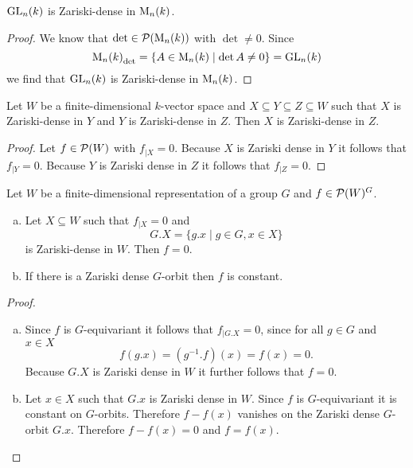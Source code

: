 \begin{cor}
 $\operatorname{GL}_n(k)$ is Zariski-dense in $\operatorname{M}_n(k)$.
\end{cor}
\begin{proof}
 We know that $\det \in \mathcal{P}(\operatorname{M}_n(k))$ with $\det \neq 0$. Since
 \[
  {\operatorname{M}_n(k)}_{\det} = \{A \in \operatorname{M}_n(k) \mid \det A \neq 0\} = \operatorname{GL}_n(k)
 \]
 we find that $\operatorname{GL}_n(k)$ is Zariski-dense in $\operatorname{M}_n(k)$.
\end{proof}


\begin{prop}
 Let $W$ be a finite-dimensional $k$-vector space and $X \subseteq Y \subseteq Z \subseteq W$ such that $X$ is Zariski-dense in $Y$ and $Y$ is Zariski-dense in $Z$. Then $X$ is Zariski-dense in $Z$.
\end{prop}
\begin{proof}
 Let $f \in \mathcal{P}(W)$ with $f_{|X} = 0$. Because $X$ is Zariski dense in $Y$ it follows that $f_{|Y} = 0$. Because $Y$ is Zariski dense in $Z$ it follows that $f_{|Z} = 0$.
\end{proof}


\begin{lem}\label{lem: zariski density orbits}
 Let $W$ be a finite-dimensional representation of a group $G$ and $f \in \mathcal{P}(W)^G$.
 \begin{enumerate}[a)]
  \item
  Let $X \subseteq W$ such that $f_{|X} = 0$ and
  \[
   G.X = \{g.x \mid g \in G, x \in X\}
  \]
  is Zariski-dense in $W$. Then $f = 0$.
  \item
  If there is a Zariski dense $G$-orbit then $f$ is constant.
 \end{enumerate}
\end{lem}
\begin{proof}\leavevmode
 \begin{enumerate}[a)]
  \item
  Since $f$ is $G$-equivariant it follows that $f_{|G.X} = 0$, since for all $g \in G$ and $x \in X$
  \[
   f(g.x) = \left(g^{-1}.f\right)(x) = f(x) = 0.
  \]
  Because $G.X$ is Zariski dense in $W$ it further follows that $f = 0$.
  \item
  Let $x \in X$ such that $G.x$ is Zariski dense in $W$. Since $f$ is $G$-equivariant it is constant on $G$-orbits. Therefore $f-f(x)$ vanishes on the Zariski dense $G$-orbit $G.x$. Therefore $f-f(x) = 0$ and $f = f(x)$.
 \end{enumerate}
\end{proof}


